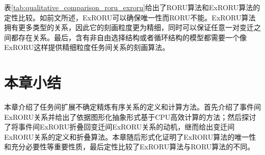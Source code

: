 表\ref{tab:qualitative_comparison_roru_exroru}给出了RORU算法和ExRORU算法的定性比较。如前文所述，ExRORU可以确保唯一性而RORU不能。ExRORU算法拥有更多类型的关系，因此它的刻画粒度更为精细，同时可以保证任意一对变迁之间都存在关系。最后，含有非自由选择结构或者循环结构的模型都需要一个像ExRORU这样提供精细粒度任务间关系的刻画算法。

\section{本章小结}\label{sec:exroru_conclusion}
本章介绍了任务间扩展不确定精炼有序关系的定义和计算方法。首先介绍了事件间ExRORU关系并给出了依据图形化抽象形式基于CPU高效计算的方法；然后探讨了将事件间ExRORU折叠回变迁间ExRORU关系的动机，继而给出变迁间ExRORU关系的定义和折叠算法。本章随后形式化证明了ExRORU算法的唯一性和充分必要性等重要性质，最后定性比较了ExRORU算法与RORU算法的不同。